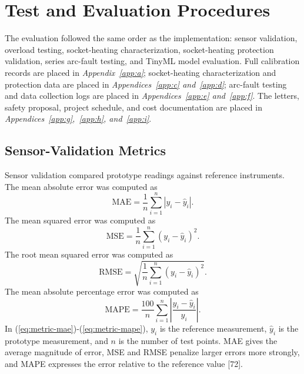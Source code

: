 \section{Test and Evaluation Procedures}
\label{sec:ch3-test-evaluation}

The evaluation followed the same order as the implementation: sensor
validation, overload testing, socket-heating characterization,
socket-heating protection validation, series arc-fault testing, and TinyML
model evaluation. Full calibration records are placed in
\textit{Appendix~\ref{app:a}}; socket-heating characterization and protection data are
placed in \textit{Appendices~\ref{app:c} and~\ref{app:d}}; arc-fault testing and data
collection logs are placed in \textit{Appendices~\ref{app:e} and~\ref{app:f}}. The
letters, safety proposal, project schedule, and cost documentation are placed
in \textit{Appendices~\ref{app:g},~\ref{app:h}, and~\ref{app:i}}.
\subsection{Sensor-Validation Metrics}
\label{sec:ch3-sensor-metrics}

Sensor validation compared prototype readings against reference instruments.
The mean absolute error was computed as
\begin{equation}
  \mathrm{MAE} =
  \frac{1}{n}\sum_{i=1}^{n}|y_i-\hat{y}_i|.
  \label{eq:metric-mae}
\end{equation}
The mean squared error was computed as
\begin{equation}
  \mathrm{MSE} =
  \frac{1}{n}\sum_{i=1}^{n}(y_i-\hat{y}_i)^2.
  \label{eq:metric-mse}
\end{equation}
The root mean squared error was computed as
\begin{equation}
  \mathrm{RMSE} =
  \sqrt{\frac{1}{n}\sum_{i=1}^{n}(y_i-\hat{y}_i)^2}.
  \label{eq:metric-rmse}
\end{equation}
The mean absolute percentage error was computed as
\begin{equation}
  \mathrm{MAPE} =
  \frac{100}{n}\sum_{i=1}^{n}
  \left|\frac{y_i-\hat{y}_i}{y_i}\right|.
  \label{eq:metric-mape}
\end{equation}
In (\ref{eq:metric-mae})-(\ref{eq:metric-mape}), $y_i$ is the reference
measurement, $\hat{y}_i$ is the prototype measurement, and $n$ is the number of
test points. MAE gives the average magnitude of error, MSE and RMSE penalize
larger errors more strongly, and MAPE expresses the error relative to the
reference value [72].


